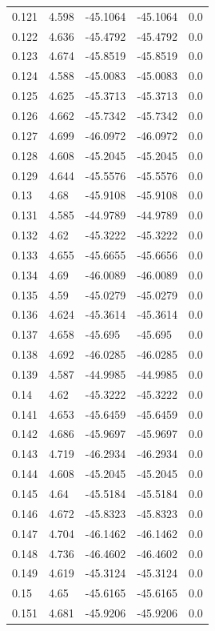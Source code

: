 \begin{table}[H]
\begin{tabular}{lllll}
0.121 & 4.598 & -45.1064 & -45.1064 & 0.0 \\
0.122 & 4.636 & -45.4792 & -45.4792 & 0.0 \\
0.123 & 4.674 & -45.8519 & -45.8519 & 0.0 \\
0.124 & 4.588 & -45.0083 & -45.0083 & 0.0 \\
0.125 & 4.625 & -45.3713 & -45.3713 & 0.0 \\
0.126 & 4.662 & -45.7342 & -45.7342 & 0.0 \\
0.127 & 4.699 & -46.0972 & -46.0972 & 0.0 \\
0.128 & 4.608 & -45.2045 & -45.2045 & 0.0 \\
0.129 & 4.644 & -45.5576 & -45.5576 & 0.0 \\
0.13 & 4.68 & -45.9108 & -45.9108 & 0.0 \\
0.131 & 4.585 & -44.9789 & -44.9789 & 0.0 \\
0.132 & 4.62 & -45.3222 & -45.3222 & 0.0 \\
0.133 & 4.655 & -45.6655 & -45.6656 & 0.0 \\
0.134 & 4.69 & -46.0089 & -46.0089 & 0.0 \\
0.135 & 4.59 & -45.0279 & -45.0279 & 0.0 \\
0.136 & 4.624 & -45.3614 & -45.3614 & 0.0 \\
0.137 & 4.658 & -45.695 & -45.695 & 0.0 \\
0.138 & 4.692 & -46.0285 & -46.0285 & 0.0 \\
0.139 & 4.587 & -44.9985 & -44.9985 & 0.0 \\
0.14 & 4.62 & -45.3222 & -45.3222 & 0.0 \\
0.141 & 4.653 & -45.6459 & -45.6459 & 0.0 \\
0.142 & 4.686 & -45.9697 & -45.9697 & 0.0 \\
0.143 & 4.719 & -46.2934 & -46.2934 & 0.0 \\
0.144 & 4.608 & -45.2045 & -45.2045 & 0.0 \\
0.145 & 4.64 & -45.5184 & -45.5184 & 0.0 \\
0.146 & 4.672 & -45.8323 & -45.8323 & 0.0 \\
0.147 & 4.704 & -46.1462 & -46.1462 & 0.0 \\
0.148 & 4.736 & -46.4602 & -46.4602 & 0.0 \\
0.149 & 4.619 & -45.3124 & -45.3124 & 0.0 \\
0.15 & 4.65 & -45.6165 & -45.6165 & 0.0 \\
0.151 & 4.681 & -45.9206 & -45.9206 & 0.0 \\

\end{tabular}
\end{table}
